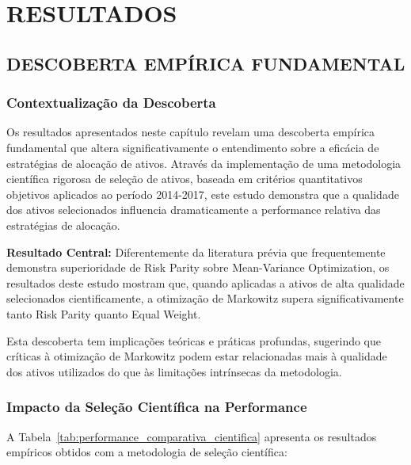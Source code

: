 
\chapter{RESULTADOS}

\section{DESCOBERTA EMPÍRICA FUNDAMENTAL}

\subsection{Contextualização da Descoberta}

Os resultados apresentados neste capítulo revelam uma descoberta empírica fundamental que altera significativamente o entendimento sobre a eficácia de estratégias de alocação de ativos. Através da implementação de uma metodologia científica rigorosa de seleção de ativos, baseada em critérios quantitativos objetivos aplicados ao período 2014-2017, este estudo demonstra que a qualidade dos ativos selecionados influencia dramaticamente a performance relativa das estratégias de alocação.

\textbf{Resultado Central:} Diferentemente da literatura prévia que frequentemente demonstra superioridade de Risk Parity sobre Mean-Variance Optimization, os resultados deste estudo mostram que, quando aplicadas a ativos de alta qualidade selecionados cientificamente, a otimização de Markowitz supera significativamente tanto Risk Parity quanto Equal Weight.

Esta descoberta tem implicações teóricas e práticas profundas, sugerindo que críticas à otimização de Markowitz podem estar relacionadas mais à qualidade dos ativos utilizados do que às limitações intrínsecas da metodologia.

\subsection{Impacto da Seleção Científica na Performance}

A Tabela~\ref{tab:performance_comparativa_cientifica} apresenta os resultados empíricos obtidos com a metodologia de seleção científica:

